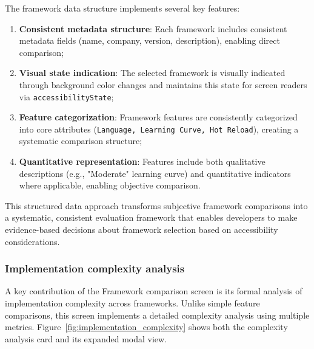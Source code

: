 The framework data structure implements several key features:

\begin{enumerate}
    \item \textbf{Consistent metadata structure}: Each framework includes consistent metadata fields (name, company, version, description), enabling direct comparison;
    
    \item \textbf{Visual state indication}: The selected framework is visually indicated through background color changes and maintains this state for screen readers via \texttt{accessibilityState};
    
    \item \textbf{Feature categorization}: Framework features are consistently categorized into core attributes (\texttt{Language, Learning Curve, Hot Reload}), creating a systematic comparison structure;
    
    \item \textbf{Quantitative representation}: Features include both qualitative descriptions (e.g., "Moderate" learning curve) and quantitative indicators where applicable, enabling objective comparison.
\end{enumerate}

This structured data approach transforms subjective framework comparisons into a systematic, consistent evaluation framework that enables developers to make evidence-based decisions about framework selection based on accessibility considerations.

\subsubsection{Implementation complexity analysis}

A key contribution of the Framework comparison screen is its formal analysis of implementation complexity across frameworks. Unlike simple feature comparisons, this screen implements a detailed complexity analysis using multiple metrics. Figure~\ref{fig:implementation_complexity} shows both the complexity analysis card and its expanded modal view.

